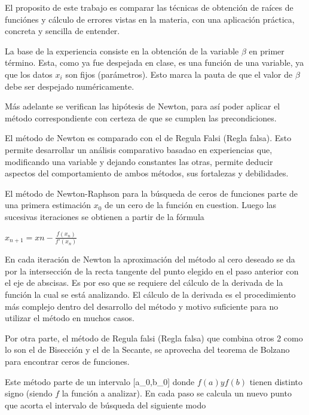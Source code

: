 El proposito de este trabajo es comparar las t\'ecnicas de obtenci\'on de ra\'ices 
de funci\'ones y c\'alculo de errores vistas en la materia, 
con una aplicaci\'on pr\'actica, concreta y sencilla de entender.

La base de la experiencia consiste en la obtenci\'on de la variable $\beta$ en
primer t\'ermino. Esta, como ya fue despejada en clase, es una funci\'on
de una variable, ya que los datos $x_i$ son fijos (par\'ametros). 
Esto marca la pauta de que el valor de $\beta$ debe ser despejado
num\'ericamente. 

M\'as adelante se verifican las hip\'otesis de Newton, para as\'i poder aplicar
el m\'etodo correspondiente con certeza de que se cumplen las precondiciones.

El m\'etodo de Newton es comparado con el de Regula Falsi (Regla falsa). Esto
permite desarrollar un an\'alisis comparativo basadao en experiencias que,
modificando una variable y dejando constantes las otras, permite deducir
aspectos del comportamiento de ambos m\'etodos, sus fortalezas y debilidades.

El m\'etodo de Newton-Raphson para la b\'usqueda de ceros de funciones parte de
una primera estimaci\'on $x_{0}$ de un cero de la funci\'on en cuestion. Luego
las sucesivas iteraciones se obtienen a partir de la f\'ormula

\begin{center}
$x_{n+1} = x{n} - \frac{f(x_{n})}{f'(x_{n})}$
\end{center}

En cada iteraci\'on de Newton la aproximaci\'on del m\'etodo al cero deseado se
da por la intersecci\'on de la recta tangente del punto elegido en el paso 
anterior con el eje de abscisas. Es por eso que se requiere del c\'alculo de la
derivada de la funci\'on la cual se est\'a analizando. El c\'alculo de la
derivada es el procedimiento m\'as complejo dentro del desarrollo del m\'etodo y
motivo suficiente para no utilizar el m\'etodo en muchos casos.

Por otra parte, el m\'etodo de Regula falsi (Regla falsa) que combina otros 2
como lo son el de Bisecci\'on y el de la Secante, se aprovecha del teorema de
Bolzano para encontrar ceros de funciones.

Este m\'etodo parte de un intervalo [a\_{0},b\_{0}] donde $f(a) y f(b)$ tienen
distinto signo (siendo $f$ la funci\'on a analizar). En cada paso se calcula un
nuevo punto que acorta el intervalo de b\'usqueda del siguiente modo

